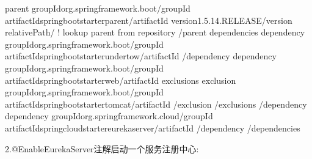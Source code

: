 \documentclass[letterpaper,10pt,english]{sphinxmanual}
\begin{document}
\begin{sphinxVerbatim}[commandchars=\\\{\}]
\PYGZlt{}parent\PYGZgt{}
  \PYGZlt{}groupId\PYGZgt{}org.springframework.boot\PYGZlt{}/groupId\PYGZgt{}
  \PYGZlt{}artifactId\PYGZgt{}spring\PYGZhy{}boot\PYGZhy{}starter\PYGZhy{}parent\PYGZlt{}/artifactId\PYGZgt{}
  \PYGZlt{}version\PYGZgt{}1.5.14.RELEASE\PYGZlt{}/version\PYGZgt{}
  \PYGZlt{}relativePath/\PYGZgt{} \PYGZlt{}!\PYGZhy{}\PYGZhy{} lookup parent from repository \PYGZhy{}\PYGZhy{}\PYGZgt{}
\PYGZlt{}/parent\PYGZgt{}
\PYGZlt{}dependencies\PYGZgt{}
  \PYGZlt{}dependency\PYGZgt{}
    \PYGZlt{}groupId\PYGZgt{}org.springframework.boot\PYGZlt{}/groupId\PYGZgt{}
    \PYGZlt{}artifactId\PYGZgt{}spring\PYGZhy{}boot\PYGZhy{}starter\PYGZhy{}undertow\PYGZlt{}/artifactId\PYGZgt{}
  \PYGZlt{}/dependency\PYGZgt{}
  \PYGZlt{}dependency\PYGZgt{}
    \PYGZlt{}groupId\PYGZgt{}org.springframework.boot\PYGZlt{}/groupId\PYGZgt{}
    \PYGZlt{}artifactId\PYGZgt{}spring\PYGZhy{}boot\PYGZhy{}starter\PYGZhy{}web\PYGZlt{}/artifactId\PYGZgt{}
    \PYGZlt{}exclusions\PYGZgt{}
      \PYGZlt{}exclusion\PYGZgt{}
        \PYGZlt{}groupId\PYGZgt{}org.springframework.boot\PYGZlt{}/groupId\PYGZgt{}
        \PYGZlt{}artifactId\PYGZgt{}spring\PYGZhy{}boot\PYGZhy{}starter\PYGZhy{}tomcat\PYGZlt{}/artifactId\PYGZgt{}
      \PYGZlt{}/exclusion\PYGZgt{}
     \PYGZlt{}/exclusions\PYGZgt{}
   \PYGZlt{}/dependency\PYGZgt{}
   \PYGZlt{}dependency\PYGZgt{}
     \PYGZlt{}groupId\PYGZgt{}org.springframework.cloud\PYGZlt{}/groupId\PYGZgt{}
     \PYGZlt{}artifactId\PYGZgt{}spring\PYGZhy{}cloud\PYGZhy{}starter\PYGZhy{}eureka\PYGZhy{}server\PYGZlt{}/artifactId\PYGZgt{}
   \PYGZlt{}/dependency\PYGZgt{}
\PYGZlt{}/dependencies\PYGZgt{}
\end{sphinxVerbatim}

2.@EnableEurekaServer注解启动一个服务注册中心:

\begin{sphinxVerbatim}[commandchars=\\\{\}]
   

           \PYG{p}{[}\PYG{p}{]}  

                 


\end{sphinxVerbatim}
\end{document}
